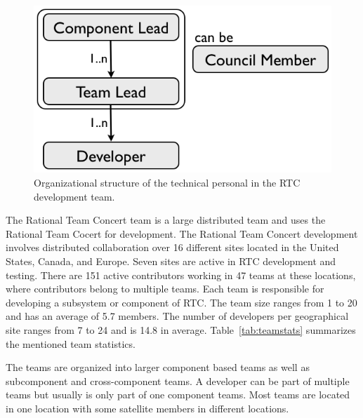 \begin{figure}[t]
\begin{center}
\includegraphics[width=.8\textwidth]{figures/meet-rtc.tex/ppl-orga}
\caption{Organizational structure of the technical personal in the RTC development team.}
\label{fig:orgastruct}
\end{center}
\end{figure}

The Rational Team Concert team is a large distributed team and uses the Rational Team Cocert for development. 
The Rational Team Concert development involves distributed collaboration over 16 different sites located in the United States, Canada, and Europe. 
Seven sites are active in RTC development and testing. 
There are 151 active contributors working in 47 teams at these locations, where contributors belong to multiple teams. 
Each team is responsible for developing a subsystem or component of RTC.
The team size ranges from 1 to 20 and has an average of 5.7 members. 
The number of developers per geographical site ranges from 7 to 24 and is 14.8 in average.
Table~\ref{tab:teamstats} summarizes the mentioned team statistics.

The teams are organized into larger component based teams as well as subcomponent and cross-component teams.
A developer can be part of multiple teams but usually is only part of one component teams.
Most teams are located in one location with some satellite members in different locations.

